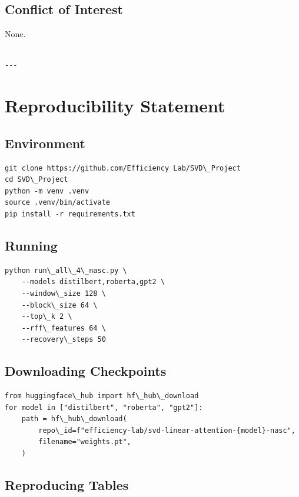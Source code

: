 \subsection{Conflict of Interest}

None.
\begin{lstlisting}

---
\end{lstlisting}


\section{Reproducibility Statement}

\subsection{Environment}

\begin{lstlisting}
git clone https://github.com/Efficiency Lab/SVD\_Project
cd SVD\_Project
python -m venv .venv
source .venv/bin/activate
pip install -r requirements.txt
\end{lstlisting}

\subsection{Running}

\begin{lstlisting}
python run\_all\_4\_nasc.py \
    --models distilbert,roberta,gpt2 \
    --window\_size 128 \
    --block\_size 64 \
    --top\_k 2 \
    --rff\_features 64 \
    --recovery\_steps 50
\end{lstlisting}

\subsection{Downloading Checkpoints}

\begin{lstlisting}
from huggingface\_hub import hf\_hub\_download
for model in ["distilbert", "roberta", "gpt2"]:
    path = hf\_hub\_download(
        repo\_id=f"efficiency-lab/svd-linear-attention-{model}-nasc",
        filename="weights.pt",
    )
\end{lstlisting}

\subsection{Reproducing Tables}

